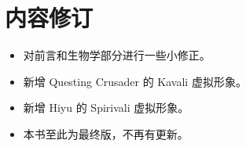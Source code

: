 \section*{内容修订}

\begin{itemize}[nosep]
	\item 对前言和生物学部分进行一些小修正。
	\item 新增 Questing Crusader 的 Kavali 虚拟形象。
	\item 新增 Hiyu 的 Spiri\textquotesingle{}vali 虚拟形象。
	\item 本书至此为最终版，不再有更新。
\end{itemize}

\clearpage
